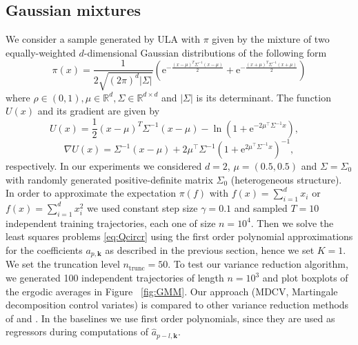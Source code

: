 \documentclass[bj]{imsart}
\def\rset{\mathbb{R}}
\def\rme{\mathrm{e}}
\def\rset{\mathbb{R}}
\def\NtrainPath{T}
\begin{document}
\subsection{Gaussian mixtures}
 We consider a sample generated by ULA with $\pi$  given by the mixture of two equally-weighted $d$-dimensional Gaussian distributions of the following form
 \[
 \pi(x) = \frac{1}{2\sqrt{(2\pi)^{d}|\Sigma|}} \left( \rme^{-\frac{(x-\mu)^T\Sigma^{-1}(x-\mu)}{2}} + \rme^{-\frac{(x+\mu)^T\Sigma^{-1}(x+\mu)}{2}}\right)
 \]
where $\rho \in (0,1), \mu \in \rset^d, \Sigma \in \rset^{d \times d}$ and $|\Sigma|$ is its determinant. The function $U(x)$ and its gradient are given by
\[
U(x) = \frac{1}{2}(x-\mu)^T\Sigma^{-1}(x-\mu) - \ln{\left(1 + \rme^{-2\mu^\top \Sigma^{-1}x}\right)}, \quad
\]
\[
\nabla U(x) = \Sigma^{-1}(x-\mu) +2\mu^\top\Sigma^{-1}\left(1 + \rme^{2 \mu^\top\Sigma^{-1} x}\right)^{-1},
\]
respectively.
In our experiments we considered $d = 2$, $\mu = \left(0.5,0.5\right)$ and $\Sigma = \Sigma_0$ with randomly generated positive-definite matrix $\Sigma_0$ (heterogeneous structure). In order to approximate the expectation \(\pi(f)\) with \(f(x)=\sum_{i=1}^d x_i\) or \(f(x) = \sum_{i=1}^d x^2_i\) we used constant step size $\gamma=0.1$ and sampled $\NtrainPath = 10$ independent training trajectories, each one of size $n = 10^4$.  Then we solve the least squares  problems \eqref{eq:Qcircr} using the first order polynomial approximations for the coefficients \(a_{p,\mathbf{k}}\) as described in the previous section, hence we set $K = 1$. We set the truncation level \(n_{\mathrm{trunc}} = 50\). To test our variance reduction algorithm, we generated 100 independent trajectories of length $n = 10^3$ and plot boxplots of the ergodic averages in Figure ~\ref{fig:GMM}. Our approach (MDCV, Martingale decomposition control variates) is compared to other variance reduction methods of \cite{mira2013zero} and \cite{belomestny2019esvm}. In the baselines we use first order polynomials, since they are used as regressors during computations of $\hat{a}_{p-l,\mathbf{k}}$.
\end{document}
